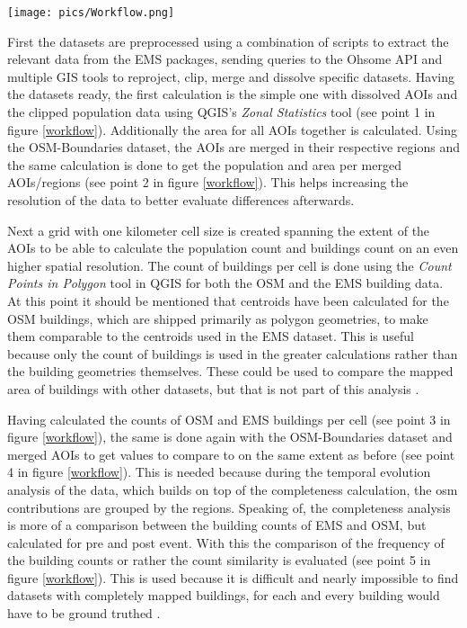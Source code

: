 \documentclass[oneside,twocolumn,10pt,cleanfoot,cleanhead]{asme2ej}
\begin{document}
\begin{figure*}
    \centerline{\texttt{[image: pics/Workflow.png]}}
    \caption{Workflow of the analysis. Element coloring: Green, blue and orange are inputs, grey are intermediate steps, dark grey are calculations and brown is the completeness and temporal evolution analysis [own figure]}
    \label{workflow}
\end{figure*}

First the datasets are preprocessed using a combination of scripts to extract the relevant data from the EMS packages, sending queries to the Ohsome API and multiple GIS tools to reproject, clip, merge and dissolve specific datasets.
Having the datasets ready, the first calculation is the simple one with dissolved AOIs and the clipped population data using QGIS's \textit{Zonal Statistics} tool (see point 1 in figure \ref{workflow}).
Additionally the area for all AOIs together is calculated.
Using the OSM-Boundaries dataset, the AOIs are merged in their respective regions and the same calculation is done to get the population and area per merged AOIs/regions (see point 2 in figure \ref{workflow}).
This helps increasing the resolution of the data to better evaluate differences afterwards.

Next a grid with one kilometer cell size is created spanning the extent of the AOIs to be able to calculate the population count and buildings count on an even higher spatial resolution.
The count of buildings per cell is done using the \textit{Count Points in Polygon} tool in QGIS for both the OSM and the EMS building data.
At this point it should be mentioned that centroids have been calculated for the OSM buildings, which are shipped primarily as polygon geometries, to make them comparable to the centroids used in the EMS dataset.
This is useful because only the count of buildings is used in the greater calculations rather than the building geometries themselves.
These could be used to compare the mapped area of buildings with other datasets, but that is not part of this analysis \cite{BarronEA2014}.

Having calculated the counts of OSM and EMS buildings per cell (see point 3 in figure \ref{workflow}), the same is done again with the OSM-Boundaries dataset and merged AOIs to get values to compare to on the same extent as before (see point 4 in figure \ref{workflow}).
This is needed because during the temporal evolution analysis of the data, which builds on top of the completeness calculation, the osm contributions are grouped by the regions.
Speaking of, the completeness analysis is more of a comparison between the building counts of EMS and OSM, but calculated for pre and post event.
With this the comparison of the frequency of the building counts or rather the count similarity is evaluated (see point 5 in figure \ref{workflow}).
This is used because it is difficult and nearly impossible to find datasets with completely mapped buildings, for each and every building would have to be ground truthed \cite{HerfortEA2021, BarronEA2014}.
\end{document}
